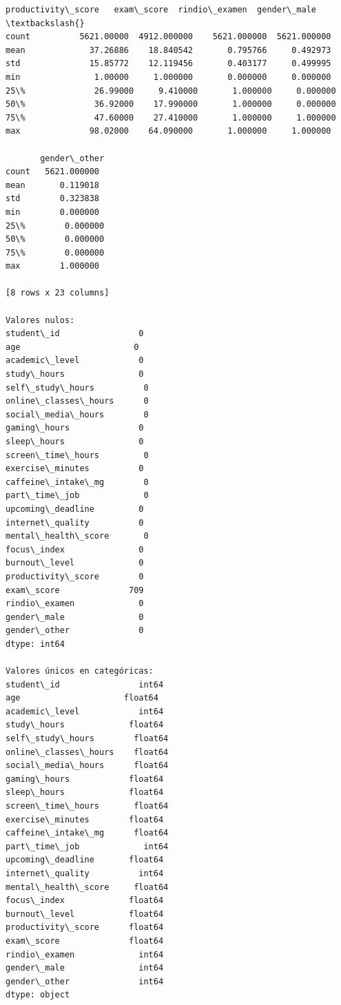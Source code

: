 \documentclass[11pt]{article}
\begin{document}
\begin{Verbatim}[commandchars=\\\{\}]
       productivity\_score   exam\_score  rindio\_examen  gender\_male  \textbackslash{}
count          5621.00000  4912.000000    5621.000000  5621.000000
mean             37.26886    18.840542       0.795766     0.492973
std              15.85772    12.119456       0.403177     0.499995
min               1.00000     1.000000       0.000000     0.000000
25\%              26.99000     9.410000       1.000000     0.000000
50\%              36.92000    17.990000       1.000000     0.000000
75\%              47.60000    27.410000       1.000000     1.000000
max              98.02000    64.090000       1.000000     1.000000

       gender\_other
count   5621.000000
mean       0.119018
std        0.323838
min        0.000000
25\%        0.000000
50\%        0.000000
75\%        0.000000
max        1.000000

[8 rows x 23 columns]

Valores nulos:
student\_id                0
age                       0
academic\_level            0
study\_hours               0
self\_study\_hours          0
online\_classes\_hours      0
social\_media\_hours        0
gaming\_hours              0
sleep\_hours               0
screen\_time\_hours         0
exercise\_minutes          0
caffeine\_intake\_mg        0
part\_time\_job             0
upcoming\_deadline         0
internet\_quality          0
mental\_health\_score       0
focus\_index               0
burnout\_level             0
productivity\_score        0
exam\_score              709
rindio\_examen             0
gender\_male               0
gender\_other              0
dtype: int64

Valores únicos en categóricas:
student\_id                int64
age                     float64
academic\_level            int64
study\_hours             float64
self\_study\_hours        float64
online\_classes\_hours    float64
social\_media\_hours      float64
gaming\_hours            float64
sleep\_hours             float64
screen\_time\_hours       float64
exercise\_minutes        float64
caffeine\_intake\_mg      float64
part\_time\_job             int64
upcoming\_deadline       float64
internet\_quality          int64
mental\_health\_score     float64
focus\_index             float64
burnout\_level           float64
productivity\_score      float64
exam\_score              float64
rindio\_examen             int64
gender\_male               int64
gender\_other              int64
dtype: object
    \end{Verbatim}
\end{document}
